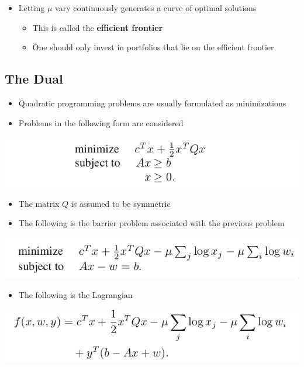 \documentclass[11pt]{article}
\begin{document}
\begin{itemize}
\item Letting \(\mu\) vary continuously generates a curve of optimal solutions
\begin{itemize}
\item This is called the \textbf{efficient frontier}
\item One should only invest in portfolios that lie on the efficient frontier
\end{itemize}
\end{itemize}

\subsection{The Dual}
\label{sec:org4865c6e}
\begin{itemize}
\item Quadratic programming problems are usually formulated as minimizations
\item Problems in the following form are considered
\end{itemize}
\begin{center}
\includegraphics[width=.9\linewidth]{Quadratic Programming/screenshot_2019-03-17_14-58-38.png}
\end{center}
\begin{itemize}
\item The matrix \(Q\) is assumed to be symmetric

\item The following is the barrier problem associated with the previous problem
\end{itemize}
\begin{center}
\includegraphics[width=.9\linewidth]{Quadratic Programming/screenshot_2019-03-17_15-03-45.png}
\end{center}
\begin{itemize}
\item The following is the Lagrangian
\end{itemize}
\begin{center}
\includegraphics[width=.9\linewidth]{Quadratic Programming/screenshot_2019-03-17_15-04-17.png}
\end{center}
\end{document}
